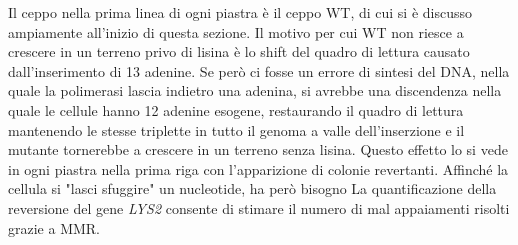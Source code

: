  Il ceppo nella prima linea di ogni piastra è il ceppo WT, di cui si è discusso ampiamente all'inizio di questa sezione. Il motivo per cui WT non riesce a crescere in un terreno privo di lisina è lo shift del quadro di lettura causato dall'inserimento di 13 adenine. Se però ci fosse un errore di sintesi del DNA, nella quale la polimerasi lascia indietro una adenina, si avrebbe una discendenza nella quale le cellule hanno 12 adenine esogene, restaurando il quadro di lettura mantenendo le stesse triplette in tutto il genoma a valle dell'inserzione e il mutante tornerebbe a crescere in un terreno senza lisina. Questo effetto lo si vede in ogni piastra nella prima riga con l'apparizione di colonie revertanti. Affinché la cellula si "lasci sfuggire" un nucleotide, ha però bisogno La quantificazione della reversione del gene \textit{LYS2} consente di stimare il numero di mal appaiamenti risolti grazie a MMR.
 
 